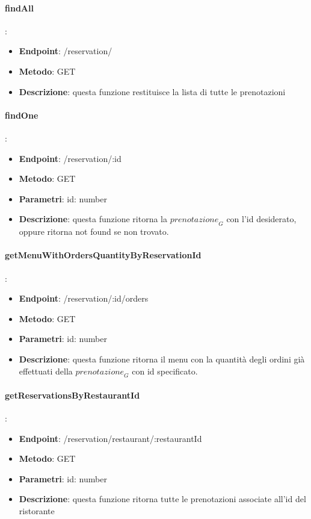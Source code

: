 \paragraph{findAll}:
\begin{itemize}
    \item \textbf{Endpoint}: /reservation/
    \item \textbf{Metodo}: GET
    \item \textbf{Descrizione}: questa funzione restituisce la lista di tutte le prenotazioni
\end{itemize}
\paragraph{findOne}:
\begin{itemize}
    \item \textbf{Endpoint}: /reservation/:id
    \item \textbf{Metodo}: GET
    \item \textbf{Parametri}: id: number
    \item \textbf{Descrizione}: questa funzione ritorna la $\textit{prenotazione}_G$ con l'id desiderato, oppure ritorna not found se non trovato.
\end{itemize}
\paragraph{getMenuWithOrdersQuantityByReservationId}:
\begin{itemize}
    \item \textbf{Endpoint}: /reservation/:id/orders
    \item \textbf{Metodo}: GET
    \item \textbf{Parametri}: id: number
    \item \textbf{Descrizione}: questa funzione ritorna il menu con la quantità degli ordini già effettuati della $\textit{prenotazione}_G$ con id specificato.
\end{itemize}
\paragraph{getReservationsByRestaurantId}:
\begin{itemize}
    \item \textbf{Endpoint}: /reservation/restaurant/:restaurantId
    \item \textbf{Metodo}: GET
    \item \textbf{Parametri}: id: number
    \item \textbf{Descrizione}: questa funzione ritorna tutte le prenotazioni associate all'id del ristorante
\end{itemize}
